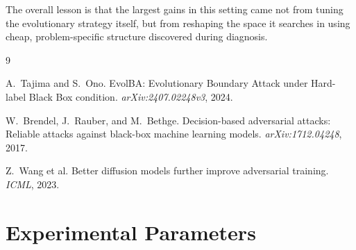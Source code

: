 \documentclass[11pt, a4paper]{article}
\begin{document}
The overall lesson is that the largest gains in this setting came not from tuning the evolutionary strategy itself, but from reshaping the space it searches in using cheap, problem-specific structure discovered during diagnosis.

\begin{thebibliography}{9}

A.\ Tajima and S.\ Ono.
\newblock EvolBA: Evolutionary Boundary Attack under Hard-label Black Box condition.
\newblock \textit{arXiv:2407.02248v3}, 2024.

W.\ Brendel, J.\ Rauber, and M.\ Bethge.
\newblock Decision-based adversarial attacks: Reliable attacks against black-box machine learning models.
\newblock \textit{arXiv:1712.04248}, 2017.

Z.\ Wang et al.
\newblock Better diffusion models further improve adversarial training.
\newblock \textit{ICML}, 2023.

\end{thebibliography}

\appendix
\section{Experimental Parameters}
\end{document}
